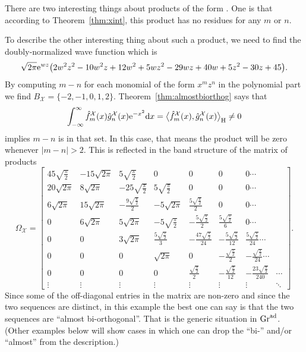 \documentclass[pdftex]{sigma}
\numberwithin{equation}{section}
\theoremstyle{definition}
\def\X{\mathcal{X}}
\def\ff{\hat f}
\def\gg{\hat g}
\begin{document}
There are two interesting things about products of the form
\smash{$
\ff_m^{\X}(x)\gg_n^{\X}(x){\rm e}^{-\frac{x^2}{2}}$}.
One is that according to Theorem~\ref{thm:xint}, this product has no residues for any $m$ or $n$.

To describe the other interesting thing about such a product, we need
to find the doubly-normalized wave function
\smash{$\hat{\hat\psi}_{\X}(x,0,z)$} which is
\begin{align*}
\sqrt{2\pi} {\rm e}^{w z}
 \bigl(2 w^2 z^2-10 w^2 z+12
 w^2+5 w z^2-29 w z+40 w+5
 z^2-30 z+45\bigr).
\end{align*}
By computing $m-n$ for each monomial of the form $x^mz^n$ in the
polynomial part we find
$
B_{\X}=\{-2,-1,0,1,2\}$.
Theorem~\ref{thm:almostbiorthog} says that
\[\int_{-\infty}^{\infty}\ff_m^{\X}(x)\gg_n^{\X}(x){\rm e}^{-x^2}{\rm d}x=\big\langle \ff_m^{\X}(x),\gg_n^{\X}(x)\big\rangle_{\rm H}\not=0\]
implies $m-n$ is in that set. In this case, that means
the product will be zero whenever $|m-n|>2$.
This is reflected in the band structure of the matrix of products
\[
\Omega_{\X}=\left[
 \begin{matrix}
 45 \sqrt{\frac{\pi }{2}} &
 -15 \sqrt{2 \pi } & 5
 \sqrt{\frac{\pi }{2}} & 0 &
 0 & 0 & 0 \cdots \\
 20 \sqrt{2 \pi } & 8 \sqrt{2
 \pi } & -25 \sqrt{\frac{\pi
 }{2}} & 5 \sqrt{\frac{\pi
 }{2}} & 0 & 0 & 0 \cdots \\
 6 \sqrt{2 \pi } & 15 \sqrt{2
 \pi } & -\frac{9
 \sqrt{\frac{\pi }{2}}}{2} &
 -5 \sqrt{2 \pi } & \frac{5
 \sqrt{\frac{\pi }{2}}}{2} &
 0 & 0 \cdots \\
 0 & 6 \sqrt{2 \pi } & 5
 \sqrt{2 \pi } & -5
 \sqrt{\frac{\pi }{2}} &
 -\frac{5 \sqrt{\frac{\pi
 }{2}}}{2} & \frac{5
 \sqrt{\frac{\pi }{2}}}{6} &
 0 \cdots \\
 0 & 0 & 3 \sqrt{2 \pi } &
 \frac{5 \sqrt{\frac{\pi
 }{2}}}{3} & -\frac{47
 \sqrt{\frac{\pi }{2}}}{24}
 & -\frac{5 \sqrt{\frac{\pi
 }{2}}}{12} & \frac{5
 \sqrt{\frac{\pi }{2}}}{24}
 \cdots \\
 0 & 0 & 0 & \sqrt{2 \pi } & 0
 & -\frac{\sqrt{\frac{\pi
 }{2}}}{2} &
 -\frac{\sqrt{\frac{\pi
 }{2}}}{24}\cdots \\
 0 & 0 & 0 & 0 &
 \frac{\sqrt{\frac{\pi
 }{2}}}{2} &
 -\frac{\sqrt{\frac{\pi
 }{2}}}{12} & -\frac{23
 \sqrt{\frac{\pi }{2}}}{240}&\cdots\\
 \vdots& \vdots& \vdots& \vdots& \vdots& \vdots& \vdots&\ddots
\end{matrix}
\right].
\]
Since some of the off-diagonal entries in the matrix are non-zero and
since the two sequences are distinct, in this example the best one can
say is that the two sequences are
``almost bi-orthogonal''. That is the generic situation in
${\rm Gr}^{\rm ad}$. (Other examples below will show
cases in which one can drop the ``bi-'' and/or ``almost'' from the description.)
\end{document}
